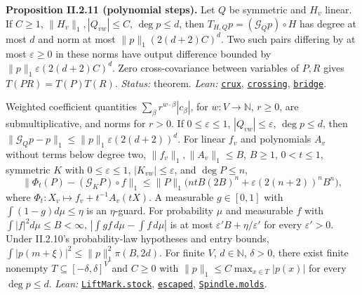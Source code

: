 \documentclass[
  letterpaper,
  11pt]{article}
\newcounter{none} %
\begin{document}
\textbf{Proposition II.2.11 (polynomial steps).} Let \(Q\) be symmetric
and \(H_v\) linear. If \(C\ge1\), \(\|H_v\|_1,|Q_{vw}|\le C\),
\(\deg p\le d\), then \(T_{H,Q}p=(\mathcal G_Qp)\circ H\) has degree at
most \(d\) and norm at most \(\|p\|_1(2(d+2)C)^d\). Two such pairs
differing by at most \(\varepsilon\ge0\) in these norms have output
difference bounded by \(\|p\|_1\varepsilon(2(d+2)C)^d\). Zero
cross-covariance between variables of \(P,R\) gives \(T(PR)=T(P)T(R)\).
\emph{Status:} theorem. \emph{Lean:}
\href{https://github.com/yang-mills-group/OpenAI-YM-20261028/blob/3456e5e75cf8d4cd558955a5c7638fba2d68f464/YM/Next/RANK/Herald.lean\#L119-L124}{\texttt{crux}},
\href{https://github.com/yang-mills-group/OpenAI-YM-20261028/blob/3456e5e75cf8d4cd558955a5c7638fba2d68f464/YM/Next/RANK/Herald.lean\#L125-L126}{\texttt{crossing}},
\href{https://github.com/yang-mills-group/OpenAI-YM-20261028/blob/3456e5e75cf8d4cd558955a5c7638fba2d68f464/YM/Next/RANK/Crust.lean\#L59}{\texttt{bridge}}.

Weighted coefficient quantities \(\sum_\beta r^{w\cdot\beta}|c_\beta|\),
for \(w:V\to\mathbb N\), \(r\ge0\), are submultiplicative, and norms for
\(r>0\). If \(0\le\varepsilon\le1\), \(|Q_{vw}|\le\varepsilon\),
\(\deg p\le d\), then
\(\|\mathcal G_Qp-p\|_1\le\|p\|_1\varepsilon(2(d+2))^d\). For linear
\(f_v\) and polynomials \(A_v\) without terms below degree two,
\(\|f_v\|_1,\|A_v\|_1\le B\), \(B\ge1\), \(0<t\le1\), symmetric \(K\)
with \(0\le\varepsilon\le1\), \(|K_{vw}|\le\varepsilon\), and
\(\deg P\le n\),
\[\|\Phi_t(P)-(\mathcal G_KP)\circ f\|_1\le\|P\|_1\big(ntB(2B)^n+\varepsilon(2(n+2))^nB^n\big),\]
where \(\Phi_t:X_v\mapsto f_v+t^{-1}A_v(tX)\). A measurable
\(g\in[0,1]\) with \(\int(1-g)d\mu\le\eta\) is an \(\eta\)-guard. For
probability \(\mu\) and measurable \(f\) with
\(\int|f|^2d\mu\le B<\infty\), \(|\int gf\,d\mu-\int f\,d\mu|\) is at
most \(\varepsilon'B+\eta/\varepsilon'\) for every \(\varepsilon'>0\).
Under II.2.10's probability-law hypotheses and entry bounds,
\(\int|p(m+\xi)|^2\le\|p\|_1^2\pi(B,2d)\). For finite \(V\),
\(d\in\mathbb N\), \(\delta>0\), there exist finite nonempty
\(T\subseteq[-\delta,\delta]^V\) and \(C\ge0\) with
\(\|p\|_1\le C\max_{x\in T}|p(x)|\) for every \(\deg p\le d\).
\emph{Lean:}
\href{https://github.com/yang-mills-group/OpenAI-YM-20261028/blob/3456e5e75cf8d4cd558955a5c7638fba2d68f464/YM/Next/RANK/Pin.lean\#L66-L84}{\texttt{LiftMark.stock}},
\href{https://github.com/yang-mills-group/OpenAI-YM-20261028/blob/3456e5e75cf8d4cd558955a5c7638fba2d68f464/YM/Next/RANK/Guard.lean\#L108-L125}{\texttt{escaped}},
\href{https://github.com/yang-mills-group/OpenAI-YM-20261028/blob/3456e5e75cf8d4cd558955a5c7638fba2d68f464/YM/Next/RANK/SpectrumReal.lean\#L56-L81}{\texttt{Spindle.molds}}.
\end{document}
